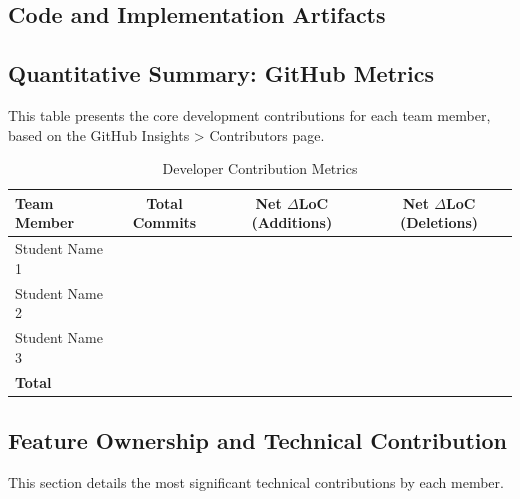\documentclass{iutbscthesis}
\begin{document}
\begin{appendices}
\begin{table}[h!]
\caption{Group Contribution and Next Plan Table}
\end{table}

\chapter{Code and Implementation Artifacts}

\section{Quantitative Summary: GitHub Metrics}

This table presents the core development contributions for each team member, based on the GitHub Insights > Contributors page.

\begin{table}[h]
    \centering
    \caption{Developer Contribution Metrics}
    \label{tab:metrics}
    \begin{tabular}{l c c c}
        \toprule
        \textbf{Team Member} & \textbf{Total Commits} & \textbf{Net $\Delta$LoC (Additions)} & \textbf{Net $\Delta$LoC (Deletions)} \\
        \midrule
        Student Name 1 & & & \\
        Student Name 2 & & & \\
        Student Name 3 & & & \\
        \midrule
        \textbf{Total} & & & \\
        \bottomrule
    \end{tabular}
\end{table}

\vspace{0.5cm}

\section{Feature Ownership and Technical Contribution}

This section details the most significant technical contributions by each member.


\end{appendices}
\end{document}
